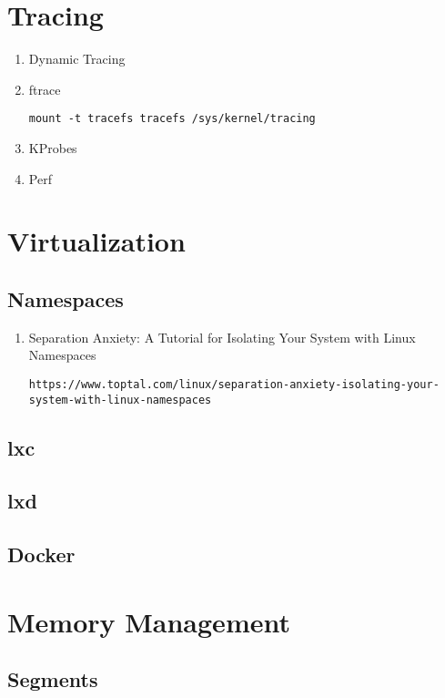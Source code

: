 \documentclass{article}
\begin{document}
\section{Tracing}

\begin{enumerate}
\item Dynamic Tracing
\item ftrace
\begin{verbatim}
mount -t tracefs tracefs /sys/kernel/tracing
\end{verbatim}
\item KProbes
\item Perf
\end{enumerate}

\section{Virtualization}

\subsection{Namespaces}

\begin{enumerate}

\item Separation Anxiety: A Tutorial for Isolating Your System with Linux Namespaces

	\texttt{https://www.toptal.com/linux/separation-anxiety-isolating-your-system-with-linux-namespaces}

\end{enumerate}

\subsection{lxc}

\subsection{lxd}

\subsection{Docker}

\section{Memory Management}

\subsection{Segments}
\end{document}
